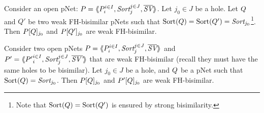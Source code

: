 \documentclass{lncs/llncs}
\newcommand{\TODO}[1]{\textcolor{red}{\textbf{[TODO:#1]}}}
\begin{document}

\begin{theorem}\label{weak-thm-congr-eq}
	Consider an open pNet:
	$\pNet = \mylangle \pNet_i^{i\in I}, \Sort_j^{j\in J}, 
	\set{\symb{SV}}\myrangle$.
	Let $j_0\in J$ be a hole. Let $Q$ and $Q'$ be two weak FH-bisimilar pNets such that 
	$\Sortop(\pNetQ)=\Sortop(\pNetQ')=\Sort_{j_0}$\footnote{Note that $\operatorname{Sort}(Q)=\operatorname{Sort}(Q')$ is 
	ensured by 
	strong bisimilarity.}. Then 
	$P[Q]_{j_0}$ and 
	$P[Q']_{j_0}$ are weak FH-bisimilar.
\end{theorem}

\begin{theorem}\label{weak-thm-ctxt-eq}
	Consider two  open pNets
	$\pNet = \mylangle \pNet_i^{i\in I}, \Sort_j^{j\in J}, 
	\set{\symb{SV}}\myrangle$ and 	$\pNet' = \mylangle {\pNet'}_i^{i\in I}, 
	\Sort_j^{j\in 
	J}, 	\set{\symb{SV'}}\myrangle$ that are weak FH-bisimilar
	(recall they must have the same holes to be bisimilar).
	Let $j_0\in J$ be a hole, and $Q$ be a pNet such that $\Sortop(\pNetQ)=\Sort_{j_0}$. Then 
	$P[Q]_{j_0}$ and 
	$P'[Q]_{j_0}$ are weak FH-bisimilar.
\end{theorem}
\end{document}
